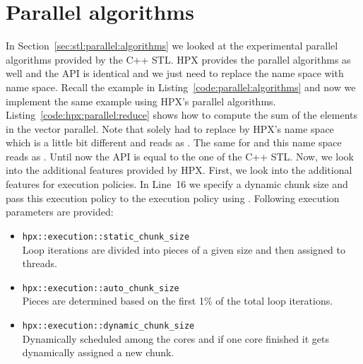 \section{Parallel algorithms}
In Section~\ref{sec:stl:parallel:algorithms} we looked at the experimental parallel algorithms provided by the C++ STL. HPX provides the parallel algorithms as well and the API is identical and we just need to replace the  name space with  name space. Recall the example in Listing~\ref{code:parallel:algorithms} and now we implement the same example using HPX's parallel algorithms. Listing~\ref{code:hpx:parallel:reduce} shows how to compute the sum of the elements in the vector  parallel. Note that solely had to replace  by HPX's name space which is a little bit different and reads as . The same for  and this name space reads as . Until now the API is equal to the one of the C++ STL. Now, we look into the additional features provided by HPX. First, we look into the additional features for execution policies. In Line~16 we specify a dynamic chunk size  and pass this execution policy to the execution policy using . Following execution parameters are provided:
\vspace{0.25cm}
\begin{itemize}
\item \lstinline|hpx::execution::static_chunk_size| \\
Loop iterations are divided into pieces of a given size and then assigned to threads.
\item \lstinline|hpx::execution::auto_chunk_size| \\
Pieces are determined based on the first 1\% of the total loop iterations. 
\item \lstinline|hpx::execution::dynamic_chunk_size| \\
Dynamically scheduled among the cores and if one core finished it gets dynamically assigned a new chunk.
\end{itemize}
